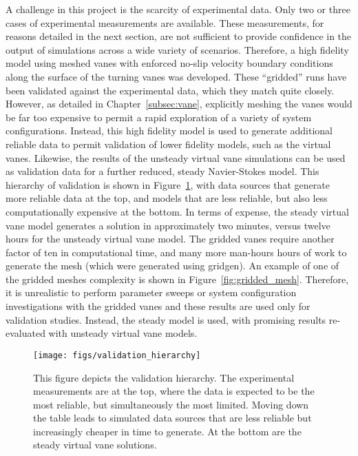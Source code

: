 A challenge in this project is the scarcity of experimental data. Only
two or three cases of experimental measurements are available. These
measurements, for reasons detailed in the next section, are not
sufficient to provide confidence in the output of simulations across a
wide variety  of scenarios. Therefore, a high fidelity model using 
meshed vanes with enforced no-slip velocity boundary conditions along
the surface of the turning vanes was developed. These ``gridded'' runs have
been validated against the experimental data, which they match quite
closely. However, as detailed in Chapter~\ref{subsec:vane}, 
explicitly meshing the vanes would be far too 
expensive to permit a rapid exploration of a variety of
system configurations. Instead, this high fidelity model is used 
to generate additional reliable data to permit validation of lower
fidelity models, such as the virtual vanes. Likewise, the results of the
unsteady virtual vane simulations can be used as validation data for a
further reduced, steady Navier-Stokes model. This hierarchy of
validation is shown in Figure~\ref{fig:val_hier}, with data sources that
generate more reliable data at the top, and models that are less
reliable, but also less computationally expensive at the bottom. In
terms of expense, the steady virtual vane model generates a solution in
approximately two minutes, versus twelve hours for the unsteady virtual
vane model. The gridded vanes require another factor of ten in
computational time, and many more man-hours hours of work to generate
the mesh (which were generated using gridgen). An example of one of the
gridded meshes complexity is shown in Figure~\ref{fig:gridded_mesh}. 
Therefore, it is unrealistic to perform parameter sweeps or
system configuration investigations with the gridded vanes and these
results are used only for validation studies. Instead, the
steady model is used, with promising results re-evaluated with unsteady
virtual vane models. %

%
%
 \begin{figure}[!htb]
   \begin{center}
    \texttt{[image: figs/validation\_hierarchy]}
    \caption{This figure depicts the validation hierarchy. The
    experimental measurements are at the top, where the data is expected
    to be the most reliable, but simultaneously the most
    limited. Moving down the table leads to simulated data sources that
    are less reliable but increasingly cheaper in time to generate. At
    the bottom are the steady virtual vane solutions.} 
    \label{fig:val_hier}
   \end{center}
 \end{figure}

